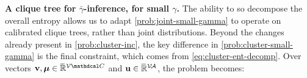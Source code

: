 \documentclass{article}
\newcommand\zogamma{{\bar\gamma}}
\begin{document}
\textbf{A clique tree for $\zogamma$-inference, for small $\gamma$.}
The ability to so decompose the overall entropy allows us to adapt 
\eqref{prob:joint-small-gamma} 
to operate on calibrated clique trees, rather than joint distributions. 
Beyond the changes already present in \eqref{prob:cluster-inc},
the key difference in \eqref{prob:cluster-small-gamma} 
is the final constraint, which comes from
\eqref{eq:cluster-ent-decomp}.
Over vectors
$\mat v, \bmu \in \Rext^{\V\C}$ and
$\mathbf{u} \in \mskip1mu\overline{\mskip-1mu\mathbb R\!}\,^{\mathcal V\!\mathcal A}$,
the problem becomes: 
\end{document}
